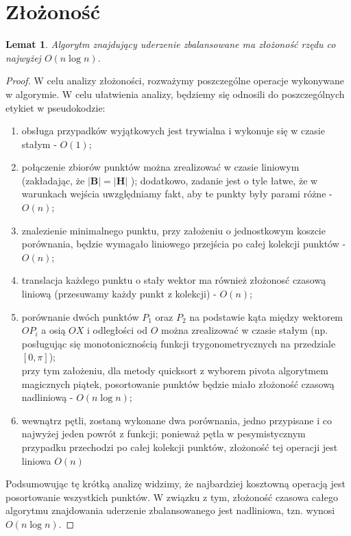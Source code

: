 \documentclass[10pt,a4paper]{article}
\newtheorem{lemma}{Lemat}
\begin{document}
	\section{Złożoność}
	
	\begin{lemma}
		Algorytm znajdujący uderzenie zbalansowane ma złożoność rzędu co najwyżej $O(n \log n)$.
	\end{lemma}
	
	\begin{proof}
		W celu analizy złożoności, rozważymy poszczególne operacje wykonywane w algorymie. W celu ułatwienia analizy, będziemy się odnosili do poszczególnych etykiet w pseudokodzie:
		\begin{enumerate}
			\item obsługa przypadków wyjątkowych jest trywialna i wykonuje się w czasie stałym - $O(1)$;
			\item połączenie zbiorów punktów można zrealizować w czasie liniowym (zakładając, że $|\mathbf{B}| = |\mathbf{H}|$ ); dodatkowo, zadanie jest o tyle łatwe, że w warunkach wejścia uwzględniamy fakt, aby te punkty były parami różne - $O(n)$;
			\item znalezienie minimalnego punktu, przy założeniu o jednostkowym koszcie porównania, będzie wymagało liniowego przejścia po całej kolekcji punktów - $O(n)$;
			\item translacja każdego punktu o stały wektor ma również złożonosć czasową liniową (przesuwamy każdy punkt z kolekcji) - $O(n)$;
			\item porównanie dwóch punktów $P_{1}$ oraz $P_{2}$ na podstawie kąta między wektorem $OP_{i}$ a osią $OX$ i odległości od $O$ można zrealizować w czasie stałym (np. posługując się monotonicznością funkcji trygonometrycznych na przedziale $\left[0, \pi\right]$); \\ przy tym założeniu, dla metody quicksort z wyborem pivota algorytmem magicznych piątek, posortowanie punktów będzie miało złożoność czasową nadliniową - $O(n \log n)$;
			\item wewnątrz pętli, zostaną wykonane dwa porównania, jedno przypisane i co najwyżej jeden powrót z funkcji; ponieważ pętla w pesymistycznym przypadku przechodzi po całej kolekcji punktów, złożoność tej operacji jest liniowa $O(n)$
		\end{enumerate}
		
		Podsumowując tę krótką analizę widzimy, że najbardziej kosztowną operacją jest posortowanie wszystkich punktów. W związku z tym, złożoność czasowa całego algorytmu znajdowania uderzenie zbalansowanego jest nadliniowa, tzn. wynosi $O(n \log n)$.
	\end{proof}
	
\end{document}
